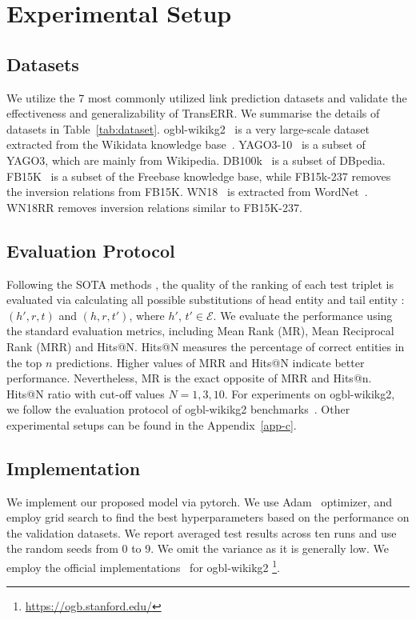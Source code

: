 \documentclass[11pt]{article}
\begin{document}
\section{Experimental Setup}


\subsection{Datasets}
We utilize the 7 most commonly utilized link prediction datasets and validate the effectiveness and generalizability of TransERR. We summarise the details of datasets in Table~\ref{tab:dataset}. ogbl-wikikg2~\cite{hu2020open} is a very large-scale dataset extracted from the Wikidata knowledge base~\cite{10.1145/2629489}. YAGO3-10~\cite{6suchanek2007yago} is a subset of YAGO3, which are mainly from Wikipedia. DB100k~\cite{63ding2018improving} is a subset of DBpedia. FB15K~\cite{7bordes2013translating} is a subset of the Freebase knowledge base, while {FB15k-237} \cite{36toutanova2015observed} removes the inversion relations from FB15K. {WN18}~\cite{7bordes2013translating} is extracted from WordNet~\cite{5miller1995wordnet}. {WN18RR} \cite{11dettmers2018convolutional} removes inversion relations similar to FB15K-237.






\subsection{Evaluation Protocol}

Following the SOTA methods \cite{31sun2019rotate,52chao2020pairre}, the quality of the ranking of each test triplet is evaluated via calculating all possible substitutions of head entity and tail entity : $(h',r,t)$ and $(h,r,t')$, where $h'$, $t'\in \mathcal{E}$. We evaluate the performance using the standard evaluation metrics, including Mean Rank (MR), Mean Reciprocal Rank (MRR) and Hits@N. Hits@N measures the percentage of correct entities in the top $n$ predictions. Higher values of MRR and Hits@N indicate better performance. Nevertheless, MR is the exact opposite of MRR and Hits@n. Hits@N ratio with cut-off values $N = 1, 3, 10$. For experiments on ogbl-wikikg2, we follow the evaluation protocol of ogbl-wikikg2 benchmarks~\cite{hu2020open}. Other experimental setups can be found in the Appendix~\ref{app-c}.



\subsection{Implementation} 
We implement our proposed model via pytorch. We use Adam~\cite{adam} optimizer, and employ grid search to find the best hyperparameters based on the performance on the validation datasets. We report averaged test results across ten runs and use the random seeds from 0 to 9. We omit the variance as it is generally low.  We employ the official implementations~\cite{hu2020open} for ogbl-wikikg2 \footnote{\url{https://ogb.stanford.edu/}}. 
\end{document}
